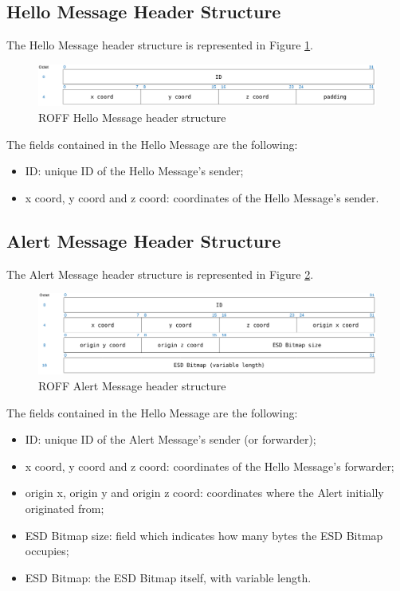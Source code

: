 		\subsection{Hello Message Header Structure}
			The Hello Message header structure is represented in Figure \ref{fig:roffHelloHeader}.
				
			\begin{figure}[H]
				\centering
				\includegraphics[width=\textwidth]{immagini/roffHelloHeader}
				\caption{ROFF Hello Message header structure}
				\label{fig:roffHelloHeader}
			\end{figure}
				
			The fields contained in the Hello Message are the following:
			\begin{itemize}
				\item ID: unique ID of the Hello Message's sender;
				\item x coord, y coord and z coord: coordinates of the Hello Message's sender.
			\end{itemize}
		
		\subsection{Alert Message Header Structure}
			The Alert Message header structure is represented in Figure \ref{fig:roffAlertHeader}.
			
			\begin{figure}[H]
				\centering
				\includegraphics[width=\textwidth]{immagini/roffAlertHeader}
				\caption{ROFF Alert Message header structure}
				\label{fig:roffAlertHeader}
			\end{figure}
			
			The fields contained in the Hello Message are the following:
			\begin{itemize}
				\item ID: unique ID of the Alert Message's sender (or forwarder);
				\item x coord, y coord and z coord: coordinates of the Hello Message's forwarder;
				\item origin x, origin y and origin z coord: coordinates where the Alert initially originated from;
				\item ESD Bitmap size: field which indicates how many bytes the ESD Bitmap occupies;
				\item ESD Bitmap: the ESD Bitmap itself, with variable length.
			\end{itemize}
		
		
	
		
		
		
	